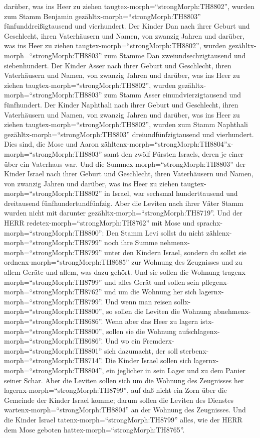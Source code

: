 darüber, was ins Heer zu ziehen taugtex-morph=``strongMorph:TH8802'',
 wurden zum Stamm Benjamin
gezähltx-morph=``strongMorph:TH8803'' fünfunddreißigtausend und
vierhundert.  Der Kinder Dan nach ihrer Geburt und
Geschlecht, ihren Vaterhäusern und Namen, von zwanzig Jahren und
darüber, was ins Heer zu ziehen taugtex-morph=``strongMorph:TH8802'',
 wurden gezähltx-morph=``strongMorph:TH8803'' zum Stamme
Dan zweiundsechzigtausend und siebenhundert.  Der Kinder
Asser nach ihrer Geburt und Geschlecht, ihren Vaterhäusern und Namen,
von zwanzig Jahren und darüber, was ins Heer zu ziehen
taugtex-morph=``strongMorph:TH8802'',  wurden
gezähltx-morph=``strongMorph:TH8803'' zum Stamm Asser
einundvierzigtausend und fünfhundert.  Der Kinder Naphthali
nach ihrer Geburt und Geschlecht, ihren Vaterhäusern und Namen, von
zwanzig Jahren und darüber, was ins Heer zu ziehen
taugtex-morph=``strongMorph:TH8802'',  wurden zum Stamm
Naphthali gezähltx-morph=``strongMorph:TH8803'' dreiundfünfzigtausend
und vierhundert.  Dies sind, die Mose und Aaron
zähltenx-morph=``strongMorph:TH8804''x-morph=``strongMorph:TH8803'' samt
den zwölf Fürsten Israels, deren je einer über ein Vaterhaus war.
 Und die Summex-morph=``strongMorph:TH8803'' der Kinder
Israel nach ihrer Geburt und Geschlecht, ihren Vaterhäusern und Namen,
von zwanzig Jahren und darüber, was ins Heer zu ziehen
taugtex-morph=``strongMorph:TH8802'' in Israel,  war
sechsmal hunderttausend und dreitausend fünfhundertundfünfzig.
 Aber die Leviten nach ihrer Väter Stamm wurden nicht mit
darunter gezähltx-morph=``strongMorph:TH8719''.  Und der
HERR redetex-morph=``strongMorph:TH8762'' mit Mose und
sprachx-morph=``strongMorph:TH8800'':  Den Stamm Levi
sollst du nicht zählenx-morph=``strongMorph:TH8799'' noch ihre Summe
nehmenx-morph=``strongMorph:TH8799'' unter den Kindern Israel,
 sondern du sollst sie ordnenx-morph=``strongMorph:TH8685''
zur Wohnung des Zeugnisses und zu allem Geräte und allem, was dazu
gehört. Und sie sollen die Wohnung tragenx-morph=``strongMorph:TH8799''
und alles Gerät und sollen sein pflegenx-morph=``strongMorph:TH8762''
und um die Wohnung her sich lagernx-morph=``strongMorph:TH8799''.
 Und wenn man reisen sollx-morph=``strongMorph:TH8800'', so
sollen die Leviten die Wohnung abnehmenx-morph=``strongMorph:TH8686''.
Wenn aber das Heer zu lagern istx-morph=``strongMorph:TH8800'', sollen
sie die Wohnung aufschlagenx-morph=``strongMorph:TH8686''. Und wo ein
Fremderx-morph=``strongMorph:TH8801'' sich dazumacht, der soll
sterbenx-morph=``strongMorph:TH8714''.  Die Kinder Israel
sollen sich lagernx-morph=``strongMorph:TH8804'', ein jeglicher in sein
Lager und zu dem Panier seiner Schar.  Aber die Leviten
sollen sich um die Wohnung des Zeugnisses her
lagernx-morph=``strongMorph:TH8799'', auf daß nicht ein Zorn über die
Gemeinde der Kinder Israel komme; darum sollen die Leviten des Dienstes
wartenx-morph=``strongMorph:TH8804'' an der Wohnung des Zeugnisses.
 Und die Kinder Israel tatenx-morph=``strongMorph:TH8799''
alles, wie der HERR dem Mose geboten
hattex-morph=``strongMorph:TH8765''.

